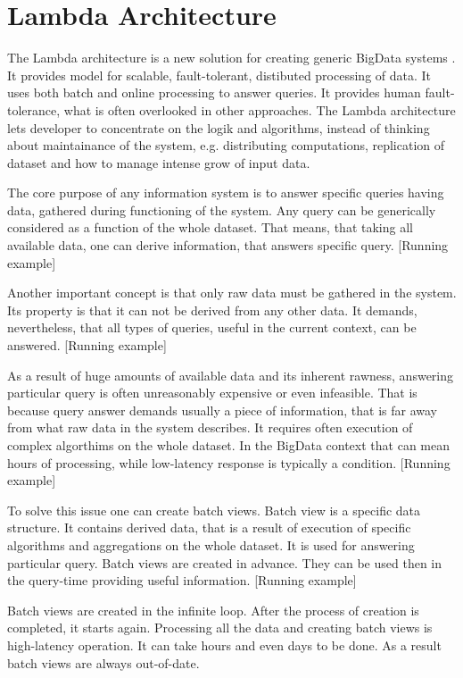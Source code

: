 \chapter{Lambda Architecture}
\label{chap:lambda_architecture}

The Lambda architecture is a new solution for creating generic BigData systems \cite{MarzWarren201401}.
It provides model for scalable, fault-tolerant, distibuted processing of data.
It uses both batch and online processing to answer queries.
It provides human fault-tolerance, what is often overlooked in other approaches.
The Lambda architecture lets developer to concentrate on the logik and
algorithms, instead of thinking about maintainance of the system, e.g.
distributing computations, replication of dataset and how to manage intense grow of input data.

The core purpose of any information system is to answer specific queries having
data, gathered during functioning of the system.
Any query can be generically considered as a function of the whole dataset.
That means, that taking all available data, one can derive information, that
answers specific query.
[Running example]

Another important concept is that only raw data  must be
gathered in the system.
Its property is that it can not be derived from any other data.
It demands, nevertheless, that all types of queries, useful in the current
context, can be answered.
[Running example]

As a result of huge amounts of available data and its inherent rawness,
answering particular query is often unreasonably expensive or even infeasible. 
That is because query answer demands usually a piece of information, that is far
away from what raw data in the system describes.
It requires often execution of complex algorthims on the whole dataset.
In the BigData context that can mean hours of processing, while low-latency
response is typically a condition.
[Running example]

To solve this issue one can create batch views.
Batch view  is a specific data structure.
It contains derived data, that is a result of execution of specific algorithms
and aggregations on the whole dataset.
It is used for answering particular query.
Batch views are created in advance.
They can be used then in the query-time providing useful information.
[Running example]

Batch views are created in the infinite loop.
After the process of creation is completed, it starts again.
Processing all the data and creating batch views is high-latency operation.
It can take hours and even days to be done.
As a result batch views are always out-of-date.

